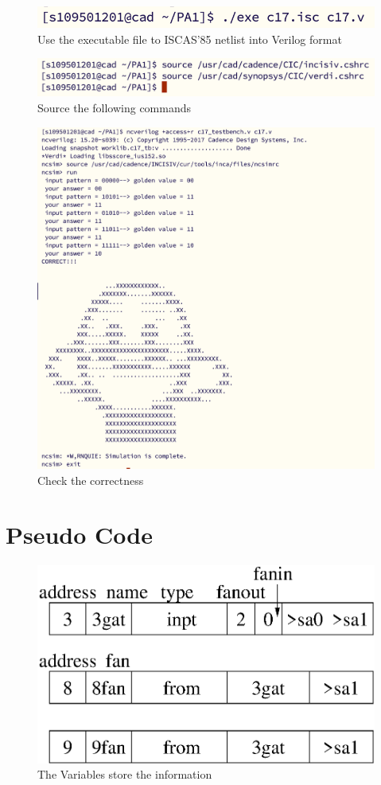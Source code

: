 \documentclass{article}
\begin{document}
\vspace*{-1em}

\begin{figure}[H]
  \centering
  \includegraphics[width=0.5\linewidth]{./img/2024-03-19-09-26-28.png}
  \caption{Use the executable file to ISCAS'85 netlist into Verilog format}
  \label{exe}
\end{figure}

\vspace*{-1em}

\begin{figure}[H]
  \centering
  \includegraphics[width=0.7\linewidth]{./img/2024-03-19-09-30-34.png}
  \caption{Source the following commands}
  \label{source}
\end{figure}

\vspace*{-1em}

\begin{figure}[H]
  \centering
  \includegraphics[width=0.6\linewidth]{./img/2024-03-19-12-45-07.png}
  \caption{Check the correctness}
  \label{check}
\end{figure}

\pagebreak

\section{Pseudo Code}

\begin{figure}[H]
\centering
\includegraphics*[width =0.3 \linewidth]{./1.eps}
\caption{The Variables store the information}
\end{figure}
\end{document}
